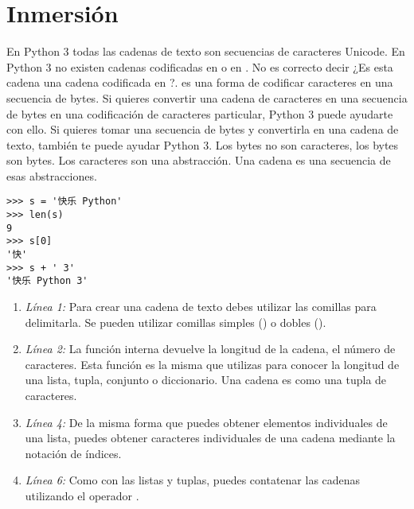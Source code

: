 \section{Inmersión}

En Python 3 todas las cadenas de texto son secuencias de caracteres Unicode. En Python 3 no existen cadenas codificadas en  o en . No es correcto decir ¿Es esta cadena una cadena codificada en ?.  es una forma de codificar caracteres en una secuencia de bytes. Si quieres convertir una cadena de caracteres en una secuencia de bytes en una codificación de caracteres particular, Python 3 puede ayudarte con ello. Si quieres tomar una secuencia de bytes y convertirla en una cadena de texto, también te puede ayudar Python 3. Los bytes no son caracteres, los bytes son bytes. Los caracteres son una abstracción. Una cadena es una secuencia de esas abstracciones.

\noindent\begin{minipage}{\textwidth}
\begin{lstlisting}[mathescape=True,escapeinside=@@]
>>> s = '快乐 Python'
>>> len(s)
9
>>> s[0]
'快'
>>> s + ' 3'
'快乐 Python 3'
\end{lstlisting}
\end{minipage}

\begin{enumerate}

\item \emph{Línea 1:} Para crear una cadena de texto debes utilizar las comillas para delimitarla. Se pueden utilizar comillas simples () o dobles ().

\item \emph{Línea 2:} La función interna  devuelve la longitud de la cadena, el número de caracteres. Esta función es la misma que utilizas para conocer la longitud de una lista, tupla, conjunto o diccionario. Una cadena es como una tupla de caracteres.

\item \emph{Línea 4:} De la misma forma que puedes obtener elementos individuales de una lista, puedes obtener caracteres individuales de una cadena mediante la notación de índices.

\item \emph{Línea 6:} Como con las listas y tuplas, puedes contatenar las cadenas utilizando el operador \codigo{+}.

\end{enumerate}

